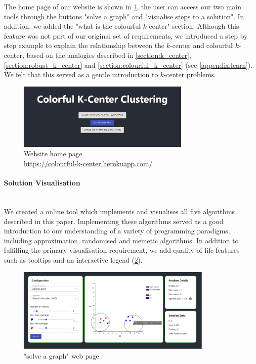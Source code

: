 The home page of our website is shown in \cref{fig:home_page}, the user can access our two main tools through the buttons "solve a graph" and "visualise steps to a solution". In addition, we added the "what is the colourful $k$-center" section. Although this feature was not part of our original set of requirements, we introduced a step by step example to explain the relationship between the $k$-center and colourful $k$-center, based on the analogies described in \cref{section:k_center}, \cref{section:robust_k_center} and \cref{section:colourful_k_center} (see \cref{appendix:learn}). We felt that this served as a gentle introduction to $k$-center problems.

\begin{figure}[H]
    \centering
    \includegraphics[width=0.75\textwidth]{images/home_page.png}
    \caption{Website home page\\\url{https://colourful-k-center.herokuapp.com/}}
    \label{fig:home_page}
\end{figure}

\paragraph{Solution Visualisation}~\\
We created a online tool which implements and visualises all five algorithms described in this paper. Implementing these algorithms served as a good introduction to our understanding of a variety of programming paradigms, including approximation, randomised and memetic algorithms. In addition to fulfilling the primary visualisation requirement, we add quality of life features such as tooltips and an interactive legend (\cref{fig:solve_app}).

\begin{figure}[H]
    \centering
    \includegraphics[width=0.85\textwidth]{images/solve_app.png}
    \caption{"solve a graph" web page}
    \label{fig:solve_app}
\end{figure}

